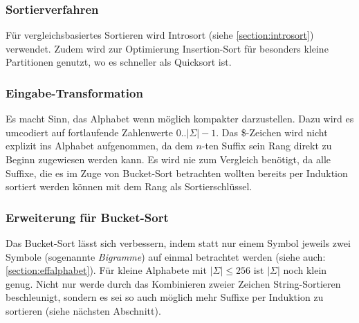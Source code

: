 \subsubsection{Sortierverfahren}

Für vergleichsbasiertes Sortieren wird Introsort (siehe \ref{section:introsort}) verwendet. Zudem wird zur Optimierung Insertion-Sort für besonders kleine Partitionen genutzt, wo es schneller als Quicksort ist.\\

\subsubsection{Eingabe-Transformation}

Es macht Sinn, das Alphabet wenn möglich kompakter darzustellen. Dazu wird es umcodiert auf fortlaufende Zahlenwerte 0..$|\Sigma|-1$. Das \$-Zeichen wird nicht explizit ins Alphabet aufgenommen, da dem $n$-ten Suffix sein Rang direkt zu Beginn zugewiesen werden kann. Es wird nie zum Vergleich benötigt, da alle Suffixe, die es im Zuge von Bucket-Sort betrachten wollten bereits per Induktion sortiert werden können mit dem Rang als Sortierschlüssel.

\subsubsection{Erweiterung für Bucket-Sort}

Das Bucket-Sort lässt sich verbessern, indem statt nur einem Symbol jeweils zwei Symbole (sogenannte \textit{Bigramme}) auf einmal betrachtet werden (siehe auch: \ref{section:effalphabet}). Für kleine Alphabete mit $|\Sigma| \leq 256$ ist $|\Sigma|$ noch klein genug. Nicht nur werde durch das Kombinieren zweier Zeichen String-Sortieren beschleunigt, sondern es sei so auch möglich mehr Suffixe per Induktion zu sortieren (siehe nächsten Abschnitt).

